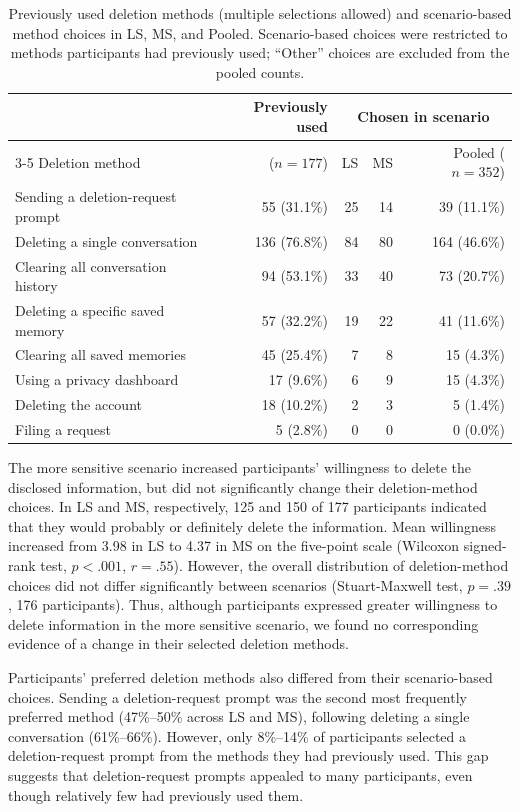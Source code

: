 \begin{table}[!t]
\centering
\caption{Previously used deletion methods (multiple selections allowed) and scenario-based method choices in LS, MS, and Pooled. Scenario-based choices were restricted to methods participants had previously used; ``Other'' choices are excluded from the pooled counts.}
\label{tab:method-use}
\small
\begin{tabular}{@{}lrrrr@{}}
\toprule
 & Previously used & \multicolumn{3}{c}{Chosen in scenario} \\
\cmidrule(lr){3-5}
Deletion method & ($n=177$) & LS & MS & Pooled ($n=352$) \\
\midrule
Sending a deletion-request prompt & 55 (31.1\%) & 25 & 14 & 39 (11.1\%) \\
Deleting a single conversation & 136 (76.8\%) & 84 & 80 & 164 (46.6\%) \\
Clearing all conversation history & 94 (53.1\%) & 33 & 40 & 73 (20.7\%) \\
Deleting a specific saved memory & 57 (32.2\%) & 19 & 22 & 41 (11.6\%) \\
Clearing all saved memories & 45 (25.4\%) & 7 & 8 & 15 (4.3\%) \\
Using a privacy dashboard & 17 (9.6\%) & 6 & 9 & 15 (4.3\%) \\
Deleting the account & 18 (10.2\%) & 2 & 3 & 5 (1.4\%) \\
Filing a request & 5 (2.8\%) & 0 & 0 & 0 (0.0\%) \\
\bottomrule
\end{tabular}
\end{table}

The more sensitive scenario increased participants' willingness to delete the disclosed information, but did not significantly change their deletion-method choices.
%
In LS and MS, respectively, 125 and 150 of 177 participants indicated that they would probably or definitely delete the information.
%
Mean willingness increased from 3.98 in LS to 4.37 in MS on the five-point scale (Wilcoxon signed-rank test, $p<.001$, $r=.55$).
%
However, the overall distribution of deletion-method choices did not differ significantly between scenarios (Stuart-Maxwell test, $p=.39$, 176 participants).
%
Thus, although participants expressed greater willingness to delete information in the more sensitive scenario, we found no corresponding evidence of a change in their selected deletion methods.

Participants' preferred deletion methods also differed from their scenario-based choices.
%
Sending a deletion-request prompt was the second most frequently preferred method (47\%--50\% across LS and MS), following deleting a single conversation (61\%--66\%).
%
However, only 8\%--14\% of participants selected a deletion-request prompt from the methods they had previously used.
%
This gap suggests that deletion-request prompts appealed to many participants, even though relatively few had previously used them.

